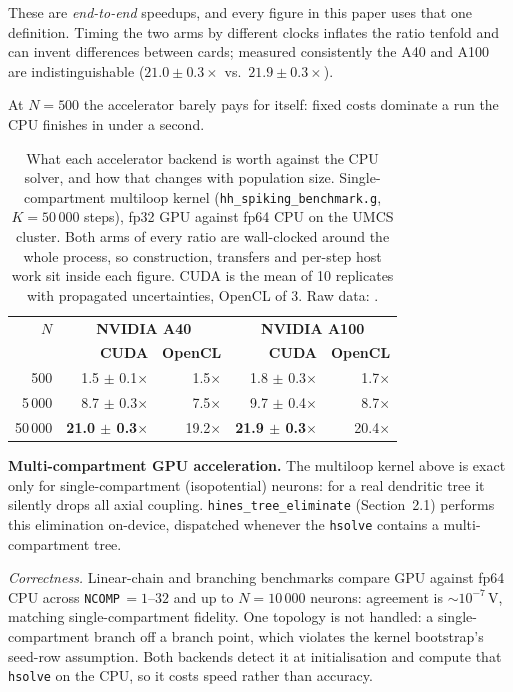 \documentclass[preprint,12pt, a4paper]{elsarticle}
\newcommand{\hte}{\texttt{hines\_\allowbreak tree\_\allowbreak eliminate}}
\begin{document}
\begin{enumerate}
These are \emph{end-to-end} speedups, and every figure in this paper uses that one definition. Timing the two arms by different clocks inflates the ratio tenfold and can invent differences between cards; measured consistently the A40 and A100 are indistinguishable ($21.0\pm0.3\times$ vs.\ $21.9\pm0.3\times$).

At $N=500$ the accelerator barely pays for itself: fixed costs dominate a run the CPU finishes in under a second.

\begin{table}[!h]
\centering
\small
\begin{tabular}{|r|r|r|r|r|}
\hline
\textbf{$N$} & \multicolumn{2}{c|}{\textbf{NVIDIA A40}} & \multicolumn{2}{c|}{\textbf{NVIDIA A100}} \\
       & \textbf{CUDA} & \textbf{OpenCL} & \textbf{CUDA} & \textbf{OpenCL} \\
\hline
500   & 1.5 $\pm$ 0.1$\times$ & 1.5$\times$ & 1.8 $\pm$ 0.3$\times$ & 1.7$\times$ \\
\hline
5\,000 & 8.7 $\pm$ 0.3$\times$ & 7.5$\times$ & 9.7 $\pm$ 0.4$\times$ & 8.7$\times$ \\
\hline
50\,000 & \textbf{21.0 $\pm$ 0.3}$\times$ & 19.2$\times$ & \textbf{21.9 $\pm$ 0.3}$\times$ & 20.4$\times$ \\
\hline
\end{tabular}
\caption{What each accelerator backend is worth against the CPU solver, and how that changes with population size. Single-compartment multiloop kernel (\texttt{hh\_spiking\_benchmark.g}, $K=50\,000$ steps), fp32 GPU against fp64 CPU on the UMCS cluster. Both arms of every ratio are wall-clocked around the whole process, so construction, transfers and per-step host work sit inside each figure. CUDA is the mean of 10 replicates with propagated uncertainties, OpenCL of 3. Raw data: \protect{}.}
\label{tab:cuda}
\end{table}

\textbf{Multi-compartment GPU acceleration.} The multiloop kernel above is exact only for single-compartment (isopotential) neurons: for a real dendritic tree it silently drops all axial coupling. \hte{} (Section~2.1) performs this elimination on-device, dispatched whenever the \texttt{hsolve} contains a multi-compartment tree.

\emph{Correctness.} Linear-chain and branching benchmarks compare GPU against fp64 CPU across \texttt{NCOMP}\,$=1$--$32$ and up to $N=10\,000$ neurons: agreement is $\sim$$10^{-7}$\,V, matching single-compartment fidelity. One topology is not handled: a single-compartment branch off a branch point, which violates the kernel bootstrap's seed-row assumption. Both backends detect it at initialisation and compute that \texttt{hsolve} on the CPU, so it costs speed rather than accuracy.


\end{enumerate}
\end{document}
